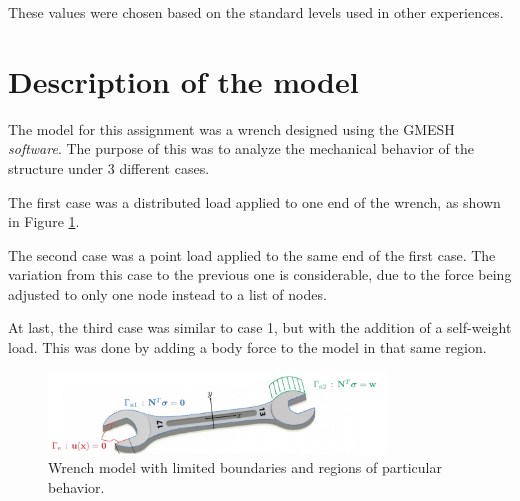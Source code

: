 \documentclass{article}  %
\begin{document}
These values were chosen based on the standard levels used in other experiences. \citet{farah2016}

\newpage

\section{Description of the model}

The model for this assignment was a wrench designed using the GMESH \textit{software}. The purpose of this was to analyze the mechanical behavior of the structure under 3 different cases. 

The first case was a distributed load applied to one end of the wrench, as shown in Figure \ref{caso1}.

The second case was a point load applied to the same end of the first case. The variation from this case to the previous one is considerable, due to the force being adjusted to only one node instead to a list of nodes.

At last, the third case was similar to case 1, but with the addition of a self-weight load. This was done by adding a body force to the model in that same region.

\begin{figure}[H]
  \centering
  \includegraphics[width=0.8\textwidth]{img/wrench.png}
  \caption{Wrench model with limited boundaries and regions of particular behavior.}
  \label{caso1}
\end{figure}





\renewcommand{\refname}{References}


\end{document}

